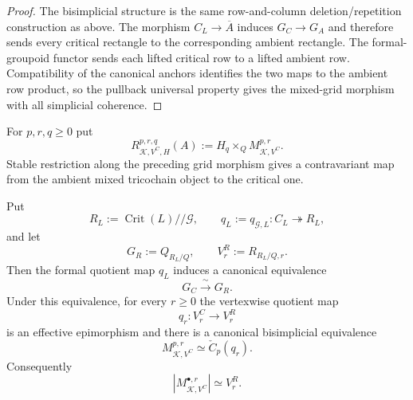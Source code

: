 \begin{proof}
The bisimplicial structure is the same row-and-column deletion/repetition
construction as above.  The morphism $C_L\to\overline A$ induces
$G_C\to G_A$ and therefore sends every critical rectangle to the corresponding
ambient rectangle.  The formal-groupoid functor sends each lifted critical row to
a lifted ambient row.  Compatibility of the canonical anchors identifies the two
maps to the ambient row product, so the pullback universal property gives the
mixed-grid morphism with all simplicial coherence.
\end{proof}

For $p,r,q\ge0$ put
\[
R_{\mathcal K,V^C,H}^{p,r,q}(A)
:=
H_q\times_QM_{\mathcal K,V^C}^{p,r}.
\]
Stable restriction along the preceding grid morphism gives a contravariant map from
the ambient mixed tricochain object to the critical one.


\begin{theorem}
\label{thm:symmetry-noether-critical-mixed-grid-is-cech-resolution}
Put
\[
R_L:=\operatorname{Crit}(L)//\mathcal G,
\qquad
q_L:=q_{\mathcal G,L}:C_L\twoheadrightarrow R_L,
\]
and let
\[
G_R:=Q_{R_L/Q},
\qquad
V^R_r:=R_{R_L/Q,r}.
\]
Then the formal quotient map $q_L$ induces a canonical equivalence
\[
\boxed{G_C\xrightarrow{\ \sim\ }G_R.}
\]
Under this equivalence, for every $r\ge0$ the vertexwise quotient map
\[
q_r:V^C_r\longrightarrow V^R_r
\]
is an effective epimorphism and there is a canonical bisimplicial equivalence
\[
\boxed{
M_{\mathcal K,V^C}^{p,r}
\simeq
\check C_p(q_r).
}
\]
Consequently
\[
\left|M_{\mathcal K,V^C}^{\bullet,r}\right|
\simeq
V^R_r.
\]
\end{theorem}

